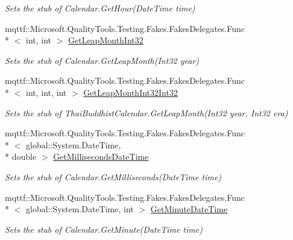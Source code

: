 \begin{DoxyCompactItemize}
\begin{DoxyCompactList}\small\item\em Sets the stub of Calendar.\-Get\-Hour(\-Date\-Time time)\end{DoxyCompactList}\item 
mqttf\-::\-Microsoft.\-Quality\-Tools.\-Testing.\-Fakes.\-Fakes\-Delegates.\-Func\\*
$<$ int, int $>$ \hyperlink{class_system_1_1_globalization_1_1_fakes_1_1_stub_thai_buddhist_calendar_ad7d2ad29cb1e7e72f93726193b583d28}{Get\-Leap\-Month\-Int32}
\begin{DoxyCompactList}\small\item\em Sets the stub of Calendar.\-Get\-Leap\-Month(\-Int32 year)\end{DoxyCompactList}\item 
mqttf\-::\-Microsoft.\-Quality\-Tools.\-Testing.\-Fakes.\-Fakes\-Delegates.\-Func\\*
$<$ int, int, int $>$ \hyperlink{class_system_1_1_globalization_1_1_fakes_1_1_stub_thai_buddhist_calendar_ac449591cbfcd8a9eccc011492688deb7}{Get\-Leap\-Month\-Int32\-Int32}
\begin{DoxyCompactList}\small\item\em Sets the stub of Thai\-Buddhist\-Calendar.\-Get\-Leap\-Month(\-Int32 year, Int32 era)\end{DoxyCompactList}\item 
mqttf\-::\-Microsoft.\-Quality\-Tools.\-Testing.\-Fakes.\-Fakes\-Delegates.\-Func\\*
$<$ global\-::\-System.\-Date\-Time, \\*
double $>$ \hyperlink{class_system_1_1_globalization_1_1_fakes_1_1_stub_thai_buddhist_calendar_a0183cd8d3eaed039e42d1c7776b0ff4c}{Get\-Milliseconds\-Date\-Time}
\begin{DoxyCompactList}\small\item\em Sets the stub of Calendar.\-Get\-Milliseconds(\-Date\-Time time)\end{DoxyCompactList}\item 
mqttf\-::\-Microsoft.\-Quality\-Tools.\-Testing.\-Fakes.\-Fakes\-Delegates.\-Func\\*
$<$ global\-::\-System.\-Date\-Time, int $>$ \hyperlink{class_system_1_1_globalization_1_1_fakes_1_1_stub_thai_buddhist_calendar_a64530bedfc3b0744b525a11509d32cee}{Get\-Minute\-Date\-Time}
\begin{DoxyCompactList}\small\item\em Sets the stub of Calendar.\-Get\-Minute(\-Date\-Time time)\end{DoxyCompactList}\item 

\end{DoxyCompactItemize}
